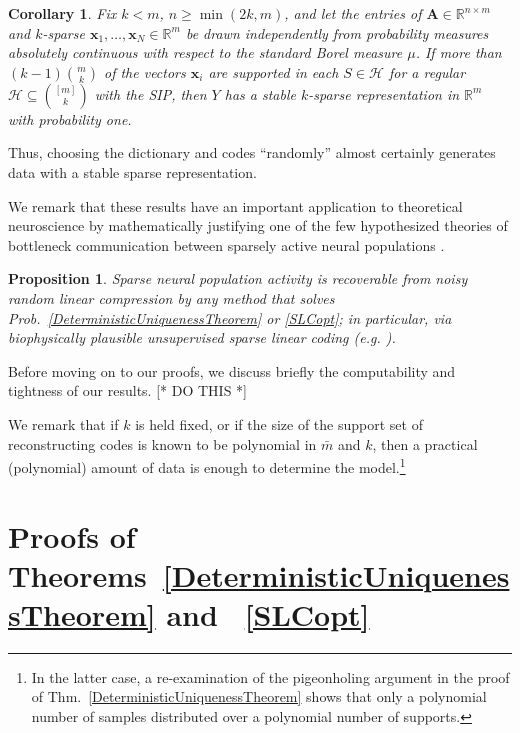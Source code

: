 \documentclass[9pt,twocolumn]{pnas-new}
\newtheorem{proposition}{Proposition}
\newtheorem{corollary}{Corollary}
\begin{document}
\begin{corollary}\label{ProbabilisticCor}
Fix $k < m$, $n \geq \min(2k, m)$, and let the entries of $\mathbf{A} \in \mathbb{R}^{n \times m}$ and $k$-sparse $\mathbf{x}_1, \ldots, \mathbf{x}_N \in \mathbb{R}^m$ be drawn independently from probability measures absolutely continuous with respect to the standard Borel measure $\mu$. If more than $(k-1){m \choose k}$ of the vectors $\mathbf{x}_i$ are supported in each $S \in \mathcal{H}$ for a regular $\mathcal{H} \subseteq {[m] \choose k}$ with the SIP, then $Y$ has a stable $k$-sparse representation in $\mathbb{R}^m$ with probability one.
\end{corollary}

Thus, choosing the dictionary and codes ``randomly'' almost certainly generates data with a stable sparse representation.

We remark that these results have an important application to theoretical neuroscience by mathematically justifying one of the few hypothesized theories of bottleneck communication between sparsely active neural populations \cite{Isely10}. 

\begin{proposition}\label{neuroprop}
Sparse neural population activity is recoverable from noisy random linear compression by any method that solves Prob.~\ref{DeterministicUniquenessTheorem} or \ref{SLCopt}; in particular, via biophysically plausible unsupervised sparse linear coding (e.g. \cite{rehnsommer2007, rozell2007neurally, ganguli2012compressed}).
\end{proposition}

Before moving on to our proofs, we discuss briefly the computability and tightness of our results. [* DO THIS *]

We remark that if $k$ is held fixed, or if the size of the support set of reconstructing codes is known to be polynomial in $\bar m$ and $k$, then a practical (polynomial) amount of data is enough to determine the model.\footnote{In the latter case, a re-examination of the pigeonholing argument in the proof of Thm.~\ref{DeterministicUniquenessTheorem} shows that only a polynomial number of samples distributed over a polynomial number of supports.}

\section{Proofs of Theorems~\ref{DeterministicUniquenessTheorem} and ~\ref{SLCopt}}\label{DUT}
\end{document}

